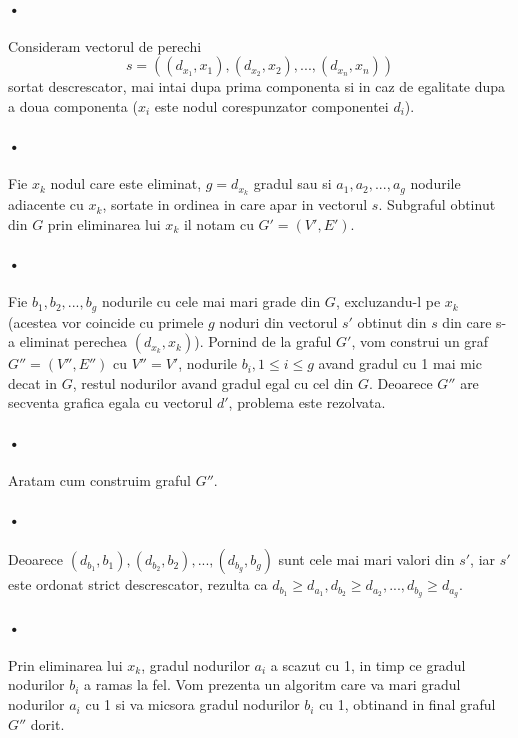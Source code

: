 \documentclass[paper=a4, fontsize=11pt]{scrartcl}
\begin{document}
\paragraph{•}
Consideram vectorul de perechi
\[ s = ((d_{x_1}, x_1), (d_{x_2}, x_2), ..., (d_{x_n}, x_n)) \]
sortat descrescator, mai intai dupa prima componenta si in caz de egalitate dupa a doua componenta ($x_i$ este nodul corespunzator componentei $d_i$).

\paragraph{•}
Fie $x_k$ nodul care este eliminat, $g=d_{x_k}$ gradul sau si $a_1, a_2, ..., a_g$ nodurile adiacente cu $x_k$, sortate in ordinea in care apar in vectorul $s$. Subgraful obtinut din $G$ prin eliminarea lui $x_k$ il notam cu $G'=(V', E')$.

\paragraph{•}
Fie $b_1, b_2, ..., b_g$ nodurile cu cele mai mari grade din $G$, excluzandu-l pe $x_k$ (acestea vor coincide cu primele $g$ noduri din vectorul $s'$ obtinut din $s$ din care s-a eliminat perechea $(d_{x_k}, x_k)$). Pornind de la graful $G'$, vom construi un graf $G''=(V'', E'')$ cu $V''=V'$, nodurile $b_i,1\leq i\leq g$ avand gradul cu 1 mai mic decat in $G$, restul nodurilor avand gradul egal cu cel din $G$. Deoarece $G''$ are secventa grafica egala cu vectorul $d'$, problema este rezolvata.

\paragraph{•}
Aratam cum construim graful $G''$.

\paragraph{•}
Deoarece $(d_{b_1}, b_1), (d_{b_2}, b_2), ..., (d_{b_g}, b_g)$ sunt cele mai mari valori din $s'$, iar $s'$ este ordonat strict descrescator, rezulta ca $d_{b_1}\geq d_{a_1}, d_{b_2}\geq d_{a_2}, ..., d_{b_g}\geq d_{a_g}$.

\paragraph{•}
Prin eliminarea lui $x_k$, gradul nodurilor $a_i$ a scazut cu 1, in timp ce gradul nodurilor $b_i$ a ramas la fel. Vom prezenta un algoritm care va mari gradul nodurilor $a_i$ cu 1 si va micsora gradul nodurilor $b_i$ cu 1, obtinand in final graful $G''$ dorit.
\end{document}
